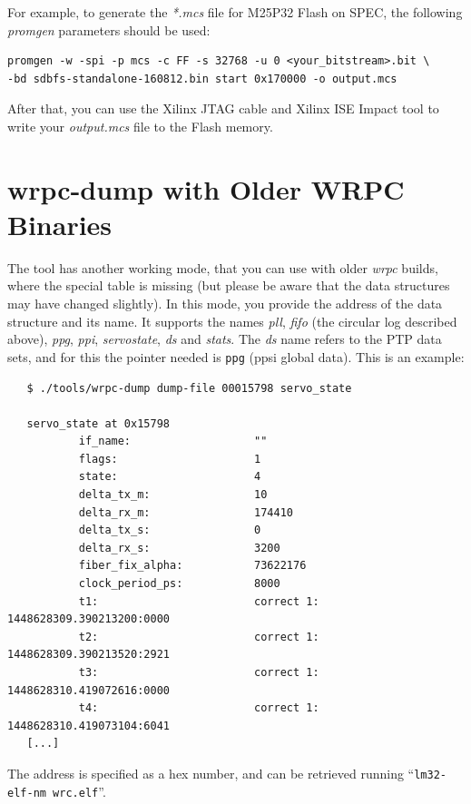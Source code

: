 \documentclass[a4paper, 12pt]{article}
\renewcommand{\_}{\underscore\allowbreak}
\begin{document}
For example, to generate the \textit{*.mcs} file for M25P32 Flash on SPEC, the
following \textit{promgen} parameters should be used:
\begin{lstlisting}
promgen -w -spi -p mcs -c FF -s 32768 -u 0 <your_bitstream>.bit \
-bd sdbfs-standalone-160812.bin start 0x170000 -o output.mcs
\end{lstlisting}

After that, you can use the Xilinx JTAG cable and Xilinx ISE Impact tool to
write your \textit{output.mcs} file to the Flash memory.
\newpage
\section{wrpc-dump with Older WRPC Binaries}
\label{wrpc-dump with Older WRPC Binaries}

The tool has another working mode, that you can use with older
\textit{wrpc} builds, where the special table is missing (but please be
aware that the data structures may have changed slightly).  In this
mode, you provide the address of the data structure and its name. It
supports the names \textit{pll}, \textit{fifo} (the circular log described
above), \textit{ppg}, \textit{ppi}, \textit{servo\_state}, \textit{ds} and
\textit{stats}. The \textit{ds} name
refers to the PTP data sets, and for this the pointer needed is
\texttt{ppg} (ppsi global data).
This is an example:

\begin{lstlisting}
   $ ./tools/wrpc-dump dump-file 00015798 servo_state

   servo_state at 0x15798
           if_name:                   ""
           flags:                     1
           state:                     4
           delta_tx_m:                10
           delta_rx_m:                174410
           delta_tx_s:                0
           delta_rx_s:                3200
           fiber_fix_alpha:           73622176
           clock_period_ps:           8000
           t1:                        correct 1: 1448628309.390213200:0000
           t2:                        correct 1: 1448628309.390213520:2921
           t3:                        correct 1: 1448628310.419072616:0000
           t4:                        correct 1: 1448628310.419073104:6041
   [...]
\end{lstlisting}

The address is specified as a hex number, and can be retrieved running
``\texttt{lm32-elf-nm  wrc.elf}''.
\end{document}
